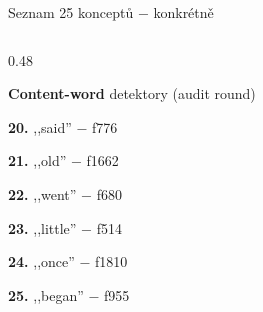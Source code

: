 \documentclass[aspectratio=169,10pt]{beamer}
\begin{document}
\begin{frame}[t]{Seznam 25 konceptů $-$ konkrétně}
\begin{columns}[T,onlytextwidth]
\begin{column}{0.48\textwidth}
{      {\color{accBlue}\textbf{Content-word} detektory (audit round)}\par\vspace{0.5mm}
      \textbf{20.} ,,said'' $-$ f776\par
      \textbf{21.} ,,old'' $-$ f1662\par
      \textbf{22.} ,,went'' $-$ f680\par
      \textbf{23.} ,,little'' $-$ f514\par
      \textbf{24.} ,,once'' $-$ f1810\par
      \textbf{25.} ,,began'' $-$ f955\par
      }
    \end{column}
  \end{columns}
\end{frame}

\end{document}
